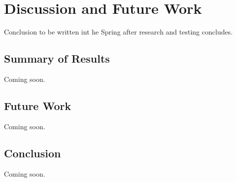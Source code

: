 %
%
%

\chapter{Discussion and Future Work}\label{ch:conclusion}

Conclusion to be written int he Spring after research and testing concludes.

\section{Summary of Results}
Coming soon.

\section{Future Work}
Coming soon.

\section{Conclusion}
Coming soon.